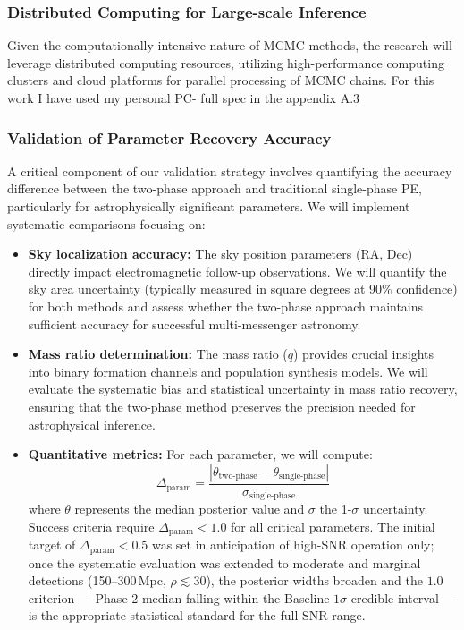\documentclass[12pt]{article}
\begin{document}
\subsubsection*{Distributed Computing for Large-scale Inference}

Given the computationally intensive nature of MCMC methods, the research will leverage distributed computing resources, utilizing high-performance computing clusters and cloud platforms for parallel processing of MCMC chains.
For this work I have used my personal PC-  full spec in the appendix A.3

\subsubsection{Validation of Parameter Recovery Accuracy}

A critical component of our validation strategy involves quantifying the accuracy difference between the two-phase approach and traditional single-phase PE, particularly for astrophysically significant parameters. We will implement systematic comparisons focusing on:

\begin{itemize}
    \item \textbf{Sky localization accuracy:} The sky position parameters (RA, Dec) directly impact electromagnetic follow-up observations. We will quantify the sky area uncertainty (typically measured in square degrees at 90\% confidence) for both methods and assess whether the two-phase approach maintains sufficient accuracy for successful multi-messenger astronomy.

    \item \textbf{Mass ratio determination:} The mass ratio ($q$) provides crucial insights into binary formation channels and population synthesis models. We will evaluate the systematic bias and statistical uncertainty in mass ratio recovery, ensuring that the two-phase method preserves the precision needed for astrophysical inference.

    \item \textbf{Quantitative metrics:} For each parameter, we will compute:
    \begin{equation}
    \Delta_{\text{param}} = \frac{|\theta_{\text{two-phase}} - \theta_{\text{single-phase}}|}{\sigma_{\text{single-phase}}}
    \end{equation}
    where $\theta$ represents the median posterior value and $\sigma$ the 1-$\sigma$ uncertainty. Success criteria require $\Delta_{\text{param}} < 1.0$ for all critical parameters. The initial target of $\Delta_{\text{param}} < 0.5$ was set in anticipation of high-SNR operation only; once the systematic evaluation was extended to moderate and marginal detections (150--300\,Mpc, $\rho \lesssim 30$), the posterior widths broaden and the $1.0$ criterion --- Phase 2 median falling within the Baseline $1\sigma$ credible interval --- is the appropriate statistical standard for the full SNR range.
\end{itemize}
\end{document}
